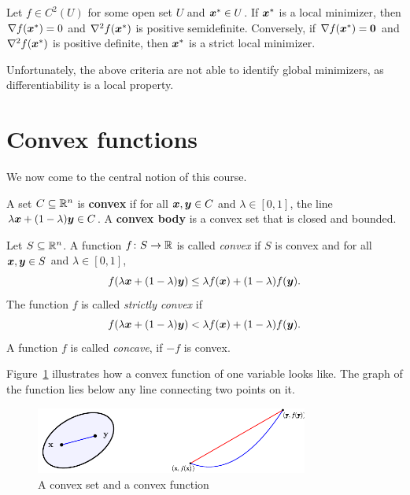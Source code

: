 \begin{theorem}
 Let $f\in C^2(U)$ for some open set $U$ and $\bm{x}^*\in U$. 
 If $\bm{x}^*$ is a local minimizer, then $\nabla f(\bm{x}^*)=0$ and $\nabla^2f(\bm{x}^*)$  is positive semidefinite. Conversely, if $\nabla f(\bm{x}^*)=\bm{0}$ and $\nabla^2f(\bm{x}^*)$ is positive definite, then $\bm{x}^*$ is a strict local minimizer. 
\end{theorem}

Unfortunately, the above criteria are not able to identify global minimizers, as differentiability is a local property.

\section{Convex functions} We now come to the central notion of this course.  

\begin{definition} A set $C\subseteq \mathbb{R}^n$ is \textbf{convex} if for all $\bm{x},\bm{y}\in C$ and $\lambda \in [0,1]$, the line $\lambda \bm{x}+(1-\lambda)\bm{y}\in C$. A \textbf{convex body} is a convex set that is closed and bounded.
\end{definition}

\begin{definition}
Let $S\subseteq \mathbb{R}^n$. 
A function $f\colon S\to \mathbb{R}$ is called {\em convex} if $S$ is convex and for all $\bm{x},\bm{y}\in S$ and $\lambda\in [0,1]$,
\begin{equation*}
 f(\lambda \bm{x}+(1-\lambda)\bm{y})\leq \lambda f(\bm{x})+(1-\lambda)f(\bm{y}).
\end{equation*}
The function $f$ is called {\em strictly convex} if
\begin{equation*}
 f(\lambda \bm{x}+(1-\lambda)\bm{y})< \lambda f(\bm{x})+(1-\lambda)f(\bm{y}).
\end{equation*}
A function $f$ is called {\em concave}, if $-f$ is convex. 
\end{definition}

Figure~\ref{fig:convfun} illustrates how a convex function of one variable looks like. The graph of the function lies below any line connecting two points on it.

\begin{figure}[h!]
\centering
 \includegraphics[width=0.8\textwidth]{images/convset.png}
 \caption{A convex set and a convex function}\label{fig:convfun}
\end{figure}

